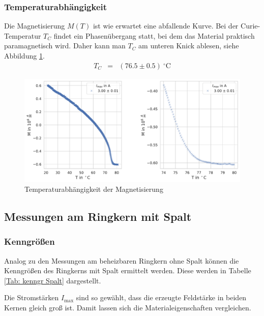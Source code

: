 \documentclass[12pt,a4paper]{scrartcl}
\numberwithin{equation}{section} %
\renewcommand{\[}{} %
\renewcommand{\]}{\noindent} %
\begin{document}
\hypertarget{temperaturabhuxe4ngigkeit-1}{%
\subsubsection{Temperaturabhängigkeit}\label{temperaturabhuxe4ngigkeit-1}}
Die Magnetisierung \(M(T)\) ist wie erwartet eine abfallende Kurve. Bei der Curie-Temperatur \(T_C\) findet ein Phasenübergang statt, bei dem das Material praktisch paramagnetisch wird. Daher kann man \(T_C\) am unteren Knick ablesen, siehe Abbildung \ref{Abb: Temperatur}.
\begin{eqnarray*}
    T_C &=& (76.5 \pm 0.5) \ ^\circ\mathrm C
\end{eqnarray*}

\begin{figure}
\centering
\includegraphics[scale=0.5]{../media/B2.4/3.3.3.pdf}
\caption{Temperaturabhängigkeit der Magnetisierung}
\label{Abb: Temperatur}
\end{figure}

\hypertarget{messungen-am-ringkern-mit-spalt-1}{%
\subsection{Messungen am Ringkern mit Spalt}\label{messungen-am-ringkern-mit-spalt-1}}

\hypertarget{kenngruxf6uxdfen-1}{%
\subsubsection{Kenngrößen}\label{kenngruxf6uxdfen-1}}
Analog zu den Messungen am beheizbaren Ringkern ohne Spalt können die Kenngrößen des Ringkerns mit Spalt ermittelt werden. Diese werden in Tabelle \ref{Tab: kenngr Spalt} dargestellt.

Die Stromstärken \(I_\mathrm{max}\) sind so gewählt, dass die erzeugte Feldstärke in beiden Kernen gleich groß ist. Damit lassen sich die Materialeigenschaften vergleichen.
\end{document}
